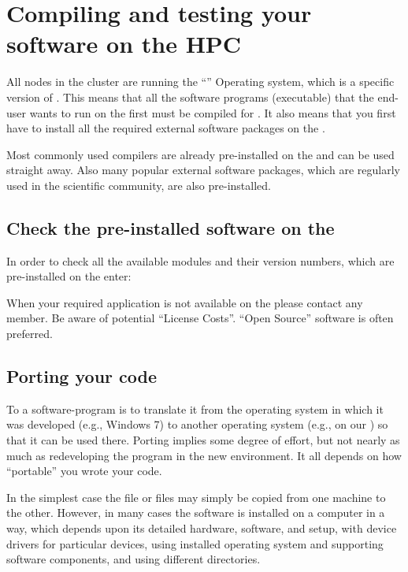 \chapter{Compiling and testing your software on the HPC}
\label{ch:compiling-and-testing-your-software-on-the-hpc}

All nodes in the \hpc cluster are running the ``\operatingsystem'' Operating
system, which is a specific version of \operatingsystembase. This means that all the
software programs (executable) that the end-user wants to run on the \hpc first
must be compiled for \operatingsystem.  It also means that you first have to
install all the required external software packages on the \hpc.

Most commonly used compilers are already pre-installed on the \hpc and can
be used straight away. Also many popular external software packages, which are
regularly used in the scientific community, are also pre-installed.

\section{Check the pre-installed software on the \hpc}

In order to check all the available modules and their version numbers, which
are pre-installed on the \hpc enter:


When your required application is not available on the \hpc please contact any
\hpc member. Be aware of potential ``License Costs''.  ``Open Source'' software
is often preferred.

\section{Porting your code}

To  a software-program is to translate it from the operating
system in which it was developed (e.g., Windows 7) to another operating system
(e.g., \operatingsystembase on our \hpc) so that it can be used there. Porting
implies some degree of effort, but not nearly as much as redeveloping the
program in the new environment.  It all depends on how ``portable'' you wrote
your code.

In the simplest case the file or files may simply be copied from one machine to
the other. However, in many cases the software is installed on a computer in a
way, which depends upon its detailed hardware, software, and setup, with device
drivers for particular devices, using installed operating system and supporting
software components, and using different directories.

